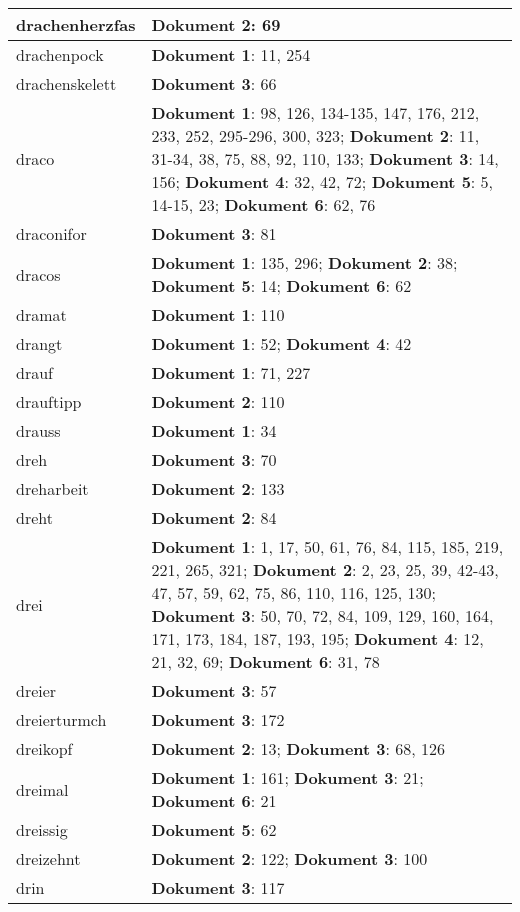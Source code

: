 \documentclass[a5paper]{article}
\begin{document}
\begin{longtable}[l]{|l|p{3in}|}
\hline
drachenherzfas & \textbf{Dokument 2}: 69 \\
\hline
drachenpock & \textbf{Dokument 1}: 11, 254 \\
\hline
drachenskelett & \textbf{Dokument 3}: 66 \\
\hline
draco & \textbf{Dokument 1}: 98, 126, 134-135, 147, 176, 212, 233, 252, 295-296, 300, 323; \textbf{Dokument 2}: 11, 31-34, 38, 75, 88, 92, 110, 133; \textbf{Dokument 3}: 14, 156; \textbf{Dokument 4}: 32, 42, 72; \textbf{Dokument 5}: 5, 14-15, 23; \textbf{Dokument 6}: 62, 76 \\
\hline
draconifor & \textbf{Dokument 3}: 81 \\
\hline
dracos & \textbf{Dokument 1}: 135, 296; \textbf{Dokument 2}: 38; \textbf{Dokument 5}: 14; \textbf{Dokument 6}: 62 \\
\hline
dramat & \textbf{Dokument 1}: 110 \\
\hline
drangt & \textbf{Dokument 1}: 52; \textbf{Dokument 4}: 42 \\
\hline
drauf & \textbf{Dokument 1}: 71, 227 \\
\hline
drauftipp & \textbf{Dokument 2}: 110 \\
\hline
drauss & \textbf{Dokument 1}: 34 \\
\hline
dreh & \textbf{Dokument 3}: 70 \\
\hline
dreharbeit & \textbf{Dokument 2}: 133 \\
\hline
dreht & \textbf{Dokument 2}: 84 \\
\hline
drei & \textbf{Dokument 1}: 1, 17, 50, 61, 76, 84, 115, 185, 219, 221, 265, 321; \textbf{Dokument 2}: 2, 23, 25, 39, 42-43, 47, 57, 59, 62, 75, 86, 110, 116, 125, 130; \textbf{Dokument 3}: 50, 70, 72, 84, 109, 129, 160, 164, 171, 173, 184, 187, 193, 195; \textbf{Dokument 4}: 12, 21, 32, 69; \textbf{Dokument 6}: 31, 78 \\
\hline
dreier & \textbf{Dokument 3}: 57 \\
\hline
dreierturmch & \textbf{Dokument 3}: 172 \\
\hline
dreikopf & \textbf{Dokument 2}: 13; \textbf{Dokument 3}: 68, 126 \\
\hline
dreimal & \textbf{Dokument 1}: 161; \textbf{Dokument 3}: 21; \textbf{Dokument 6}: 21 \\
\hline
dreissig & \textbf{Dokument 5}: 62 \\
\hline
dreizehnt & \textbf{Dokument 2}: 122; \textbf{Dokument 3}: 100 \\
\hline
drin & \textbf{Dokument 3}: 117 \\

\end{longtable}
\end{document}
